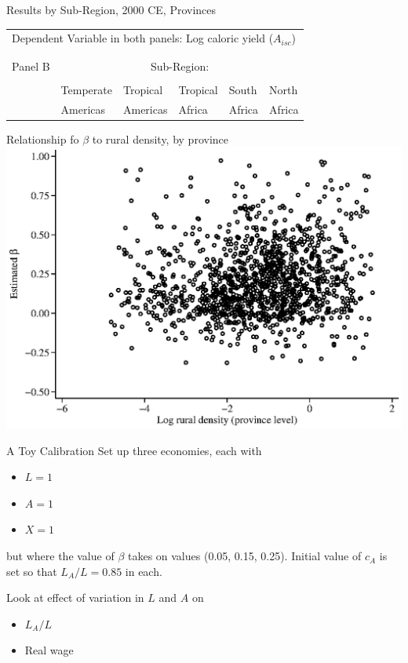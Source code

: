\documentclass[10pt, xcolor=dvipsnames]{beamer}
\begin{document}
\begin{frame}{Results by Sub-Region, 2000 CE, Provinces}

{\scriptsize
\begin{tabularx}{\textwidth}{lXXXXX}
\midrule
\multicolumn{6}{l}{Dependent Variable in both panels: Log caloric yield ($A_{isc}$)} \\ \\
\\
Panel B & \multicolumn{5}{c}{Sub-Region:} \\ \cmidrule{2-6}
 &           &   &           &          &             \\
 & Temperate & Tropical  & Tropical & South    & North    \\
 & Americas  & Americas  & Africa   & Africa   & Africa     \\
\midrule

\midrule
\end{tabularx}
}

\hfill \hyperlink{robustness}{}
\end{frame}

\begin{frame}{Relationship fo $\beta$ to rural density, by province}\label{rurdbeta}
\includegraphics[width=.8\textwidth]{fig_beta_rurd.eps}
\hfill \hyperlink{eos}{}
\end{frame}

\begin{frame}{A Toy Calibration}\label{calibration}
Set up three economies, each with
\begin{itemize}
  \item $L = 1$
  \item $A = 1$
  \item $X = 1$
\end{itemize}
but where the value of $\beta$ takes on values (0.05, 0.15, 0.25). Initial value of $c_A$ is set so that $L_A/L = 0.85$ in each.

\vspace{.2cm} Look at effect of variation in $L$ and $A$ on 
\begin{itemize}
  \item $L_A/L$
  \item Real wage
\end{itemize}
\hfill \hyperlink{elasticity}{}
\end{frame}
\end{document}
